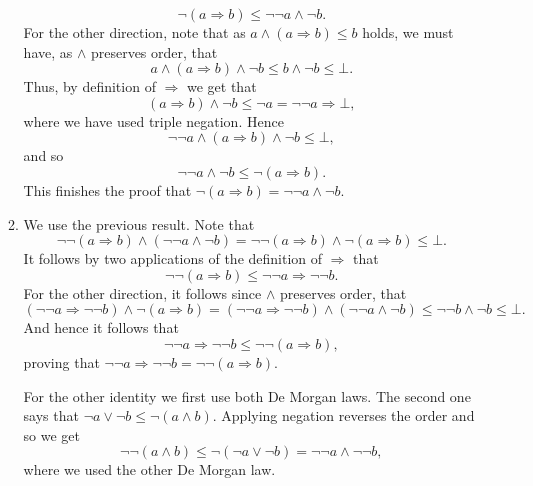 \documentclass{article}
\theoremstyle{plain}
\begin{document}
\begin{enumerate}
\begin{enumerate}
			\[
				\neg(a\Rightarrow b) \leq \neg\neg a \wedge \neg b.
			\]
			For the other direction, note that as $a\wedge (a\Rightarrow b) \leq b$ holds, we must have, as $\wedge$ preserves order, that
			\[
				a\wedge (a\Rightarrow b) \wedge \neg b \leq b \wedge \neg b \leq \bot.
			\]
			Thus, by definition of $\Rightarrow$ we get that 
			\[
				(a\Rightarrow b) \wedge \neg b \leq \neg a = \neg\neg a \Rightarrow \bot,
			\]
			where we have used triple negation. Hence
			\[
				\neg\neg a \wedge (a\Rightarrow b) \wedge \neg b \leq \bot,
			\]
			and so 
			\[
				\neg\neg a \wedge \neg b \leq \neg (a\Rightarrow b).
			\]
			This finishes the proof that $\neg(a\Rightarrow b) = \neg\neg a \wedge \neg b$.
			
			\item We use the previous result. Note that
			\[
			 \neg\neg(a\Rightarrow b) \wedge (\neg\neg a \wedge \neg b) = \neg\neg(a\Rightarrow b) \wedge \neg(a \Rightarrow b) \leq \bot.
			\]
			It follows by two applications of the definition of $\Rightarrow$ that 
			\[
				\neg\neg(a\Rightarrow b) \leq \neg\neg a \Rightarrow \neg\neg b.
			\]
			For the other direction, it follows since $\wedge$ preserves order, that 
			\begin{equation*}
				(\neg\neg a \Rightarrow \neg\neg b) \wedge \neg(a\Rightarrow b)  = (\neg\neg a \Rightarrow \neg\neg b) \wedge (\neg\neg a \wedge \neg b) \leq \neg\neg b \wedge \neg b \leq \bot.
			\end{equation*}
			And hence it follows that 
			\[
			\neg\neg a \Rightarrow \neg\neg b \leq \neg\neg(a\Rightarrow b),
			\]
			proving that $\neg\neg a \Rightarrow \neg\neg b = \neg\neg(a\Rightarrow b)$.
			
			For the other identity we first use both De Morgan laws. The second one says that $\neg a \vee \neg b \leq \neg (a \wedge b)$. Applying negation reverses the order and so we get
			\[
				\neg\neg(a\wedge b) \leq \neg (\neg a \vee \neg b) = \neg\neg a \wedge \neg\neg b,
			\]
			where we used the other De Morgan law. 
			

\end{enumerate}
\end{enumerate}
\end{document}

